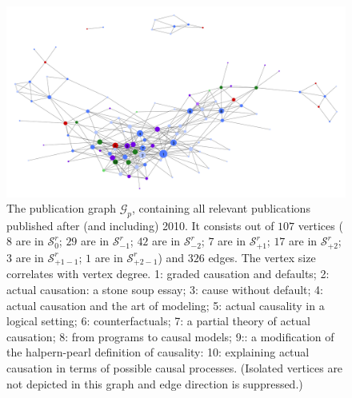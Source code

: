 \documentclass[11pt,a4paper]{book}
\theoremstyle{definition}
\theoremstyle{definition}
\theoremstyle{definition}
\theoremstyle{remark}
\newcommand{\xsetz}{\mathcal{S}_{\mathit{0}}}
\newcommand{\xsetb}{\mathcal{S}_{\mathit{-1}}}
\newcommand{\xsetbb}{\mathcal{S}_{\mathit{-2}}}
\newcommand{\xsetf}{\mathcal{S}_{\mathit{+1}}}
\newcommand{\xsetff}{\mathcal{S}_{\mathit{+2}}}
\newcommand{\xsetfb}{\mathcal{S}_{\mathit{+1-1}}}
\newcommand{\xsetffb}{\mathcal{S}_{\mathit{+2-1}}}
\newcommand{\pgraph}{\mathcal{G}_{p}}
\newcommand{\agraph}{\mathcal{G}_{a}}
\begin{document}
\begin{figure}
\includegraphics[width=\textwidth]{actual_graph.png}
\caption{The publication graph $\pgraph$, containing all relevant publications published after (and including) 2010. It consists out of $107$ vertices ($8$ are in \textcolor{cstepz}{$\xsetz^r$}; $29$ are in \textcolor{cstepb}{$\xsetb^r$};
$42$ are in \textcolor{cstepbb}{$\xsetbb^r$}; $7$ are in \textcolor{cstepf}{$\xsetf^r$}; $17$ are in \textcolor{cstepff}{$\xsetff^r$}; $3$ are in \textcolor{cstepfb}{$\xsetfb^r$}; $1$ are in \textcolor{cstepffb}{$\xsetffb^r$}) and $326$ edges. The vertex size correlates with vertex degree.
1: graded causation and defaults;
2: actual causation: a stone soup essay;
3: cause without default;
4: actual causation and the art of modeling;
5: actual causality in a logical setting;
6: counterfactuals;
7: a partial theory of actual causation;
8: from programs to causal models;
9:: a modification of the halpern-pearl definition of causality:
10: explaining actual causation in terms of possible causal processes.
(Isolated vertices are not depicted in this graph and edge direction is suppressed.)}
\label{fig:pgraph-actual_graph}
\end{figure}




\end{document}
